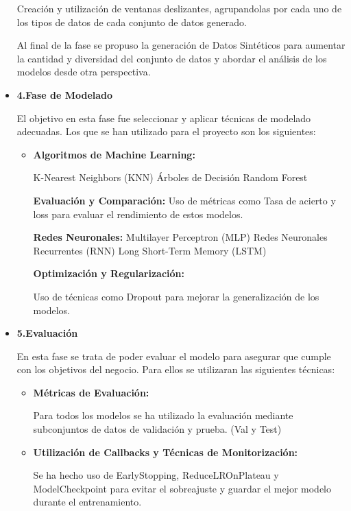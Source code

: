 \begin{itemize}
Creación y utilización de ventanas deslizantes, agrupandolas por cada uno de los tipos de datos de cada conjunto de datos generado.

Al final de la fase se propuso la generación de Datos Sintéticos para aumentar la cantidad y diversidad del conjunto de datos y abordar el análisis de los modelos desde otra perspectiva.

\item
\textbf{4.Fase de Modelado}

El objetivo en esta fase fue seleccionar y aplicar técnicas de modelado adecuadas. Los que se han utilizado para el proyecto son los siguientes:

\begin{itemize}
	
\item
\textbf{Algoritmos de Machine Learning:}

K-Nearest Neighbors (KNN)
Árboles de Decisión
Random Forest

\textbf{Evaluación y Comparación:}
Uso de métricas como Tasa de acierto y loss para evaluar el rendimiento de estos modelos.

\textbf{Redes Neuronales:}
Multilayer Perceptron (MLP)
Redes Neuronales Recurrentes (RNN)
Long Short-Term Memory (LSTM)

\textbf{Optimización y Regularización:} 

Uso de técnicas como Dropout para mejorar la generalización de los modelos.
\end{itemize}


\item
\textbf{5.Evaluación}


En esta fase se trata de poder evaluar el modelo para asegurar que cumple con los objetivos del negocio. Para ellos se utilizaran las siguientes técnicas:


\begin{itemize}
	
\item
\textbf{Métricas de Evaluación:}

Para todos los modelos se ha utilizado la evaluación mediante subconjuntos de datos de validación y prueba. (Val y Test)

\item
\textbf{Utilización de Callbacks y Técnicas de Monitorización:}

 Se ha hecho uso de EarlyStopping, ReduceLROnPlateau y ModelCheckpoint para evitar el sobreajuste y guardar el mejor modelo durante el entrenamiento.
\end{itemize}



\end{itemize}
